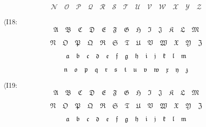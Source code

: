 \documentclass{book}
\begin{document}
$$\mathbf{\mathcal{N}}\quad \mathbf{\mathcal{O}}\quad \mathbf{\mathcal{P}}\quad 
\mathbf{\mathcal{Q}}\quad \mathbf{\mathcal{R}}\quad \mathbf{\mathcal{S}}\quad \mathbf{\mathcal{T}}\quad 
\mathbf{\mathcal{U}}\quad \mathbf{\mathcal{V}}\quad \mathbf{\mathcal{W}}\quad \mathbf{\mathcal{X}}\quad 
\mathbf{\mathcal{Y}}\quad \mathbf{\mathcal{Z}}$$

$\langle$I18:
$$\mathfrak{A}\quad \mathfrak{B}\quad \mathfrak{C}\quad \mathfrak{D}\quad
\mathfrak{E}\quad \mathfrak{F}\quad \mathfrak{G}\quad \mathfrak{H}\quad 
\mathfrak{I}\quad \mathfrak{J}\quad \mathfrak{K}\quad \mathfrak{L}\quad 
\mathfrak{M}$$ 

$$\mathfrak{N}\quad \mathfrak{O}\quad \mathfrak{P}\quad 
\mathfrak{Q}\quad \mathfrak{R}\quad \mathfrak{S}\quad \mathfrak{T}\quad 
\mathfrak{U}\quad \mathfrak{V}\quad \mathfrak{W}\quad \mathfrak{X}\quad 
\mathfrak{Y}\quad \mathfrak{Z}$$ 

$$\mathfrak{a}\quad \mathfrak{b}\quad 
\mathfrak{c}\quad \mathfrak{d}\quad \mathfrak{e}\quad \mathfrak{f}\quad 
\mathfrak{g}\quad \mathfrak{h}\quad \mathfrak{i}\quad \mathfrak{j}\quad 
\mathfrak{k}\quad \mathfrak{l}\quad \mathfrak{m}$$ 

$$\mathfrak{n}\quad 
\mathfrak{o}\quad \mathfrak{p}\quad \mathfrak{q}\quad \mathfrak{r}\quad 
\mathfrak{s}\quad \mathfrak{t}\quad \mathfrak{u}\quad \mathfrak{v}\quad 
\mathfrak{w}\quad \mathfrak{x}\quad \mathfrak{y}\quad \mathfrak{z}$$

$\langle$I19:
\[\mathbf{\mathfrak{A}}\quad \mathbf{\mathfrak{B}}\quad \mathbf{\mathfrak{C}}\quad \mathbf{\mathfrak{D}}\quad
\mathbf{\mathfrak{E}}\quad \mathbf{\mathfrak{F}}\quad \mathbf{\mathfrak{G}}\quad \mathbf{\mathfrak{H}}\quad 
\mathbf{\mathfrak{I}}\quad \mathbf{\mathfrak{J}}\quad \mathbf{\mathfrak{K}}\quad \mathbf{\mathfrak{L}}\quad 
\mathbf{\mathfrak{M}}\]

\[\mathbf{\mathfrak{N}}\quad \mathbf{\mathfrak{O}}\quad \mathbf{\mathfrak{P}}\quad 
\mathbf{\mathfrak{Q}}\quad \mathbf{\mathfrak{R}}\quad \mathbf{\mathfrak{S}}\quad \mathbf{\mathfrak{T}}\quad 
\mathbf{\mathfrak{U}}\quad \mathbf{\mathfrak{V}}\quad \mathbf{\mathfrak{W}}\quad \mathbf{\mathfrak{X}}\quad 
\mathbf{\mathfrak{Y}}\quad \mathbf{\mathfrak{Z}}\]

\[\mathbf{\mathfrak{a}}\quad \mathbf{\mathfrak{b}}\quad 
\mathbf{\mathfrak{c}}\quad \mathbf{\mathfrak{d}}\quad \mathbf{\mathfrak{e}}\quad \mathbf{\mathfrak{f}}\quad 
\mathbf{\mathfrak{g}}\quad \mathbf{\mathfrak{h}}\quad \mathbf{\mathfrak{i}}\quad \mathbf{\mathfrak{j}}\quad 
\mathbf{\mathfrak{k}}\quad \mathbf{\mathfrak{l}}\quad \mathbf{\mathfrak{m}}\]
\end{document}

